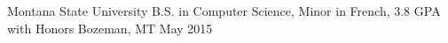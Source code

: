 

\begin{cvhonors}

  \cvhonor
    {Montana State University} %
    {B.S. in Computer Science, Minor in French, 3.8 GPA with Honors} %
    {Bozeman, MT} %
    {May 2015} %

\end{cvhonors}
